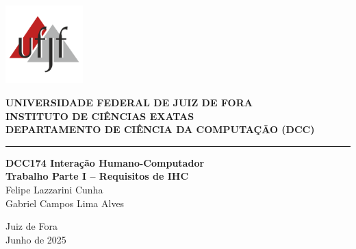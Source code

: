 \documentclass[12pt, a4paper, oneside]{abntex2}
\begin{document}
\begin{capa}
    \centering
    \vspace*{2cm}
    \begin{minipage}{0.2\textwidth}
        \includegraphics[width=3cm]{Imagens/ufjf-logo.png}
    \end{minipage}
    \hfill
    \begin{minipage}{0.7\textwidth}
        \raggedright
        \textbf{UNIVERSIDADE FEDERAL DE JUIZ DE FORA} \\
        \textbf{INSTITUTO DE CIÊNCIAS EXATAS} \\
        \textbf{DEPARTAMENTO DE CIÊNCIA DA COMPUTAÇÃO (DCC)}
    \end{minipage}
    \vspace*{3cm}
    \hrule
    \vspace*{5cm}
    \textbf{\Large DCC174 Interação Humano-Computador} \\
    \vspace{2cm}
    \textbf{\Large Trabalho Parte I – Requisitos de IHC} \\
    \vspace{2cm}
    Felipe Lazzarini Cunha \\
    Gabriel Campos Lima Alves \\
    \vfill
    \vspace*{1cm}
    \begin{center}
    Juiz de Fora\\
    Junho de 2025
    \end{center}
\end{capa}
\end{document}
